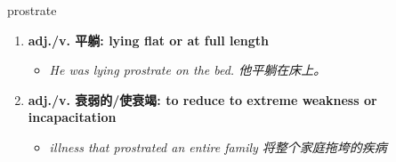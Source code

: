 
\begin{frame}
{\huge prostrate}
\begin{center}
\begin{enumerate}\Large
  \item \textbf{adj./v. 平躺: lying flat or at full length}
  \begin{itemize}
    \item \em{\Large{He was lying prostrate on the bed. 他平躺在床上。}}
  \end{itemize}
  \item \textbf{adj./v. 衰弱的/使衰竭: to reduce to extreme weakness or incapacitation}
  \begin{itemize}
    \item \em{\Large{illness that prostrated an entire family 将整个家庭拖垮的疾病}}
  \end{itemize}
\end{enumerate}
\end{center}
\end{frame}
